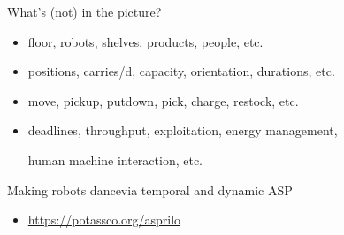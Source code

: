 \begin{frame}{What's (not) in the picture?}
  \bigskip
  \begin{itemize}
  \item {}

    floor,
    robots,
    shelves,
    products,
    people,
    etc.
    \medskip
  \item {}

    positions,
    carries/d,
    capacity,
    orientation,
    durations,
    etc.
    \medskip
  \item {}

    move,
    pickup,
    putdown,
    pick,
    charge,
    restock,
    etc.
    \medskip
  \item {}

    deadlines,
    throughput,
    exploitation,
    energy management,\par
    human machine interaction,
    etc.
  \end{itemize}
  \bigskip
\end{frame}
\begin{frame}[c]{Making robots dance}{via temporal and dynamic ASP}
  \begin{center}%
  \end{center}
  \begin{itemize}
  \item {} \url{https://potassco.org/asprilo}
  \end{itemize}
\end{frame}
%
